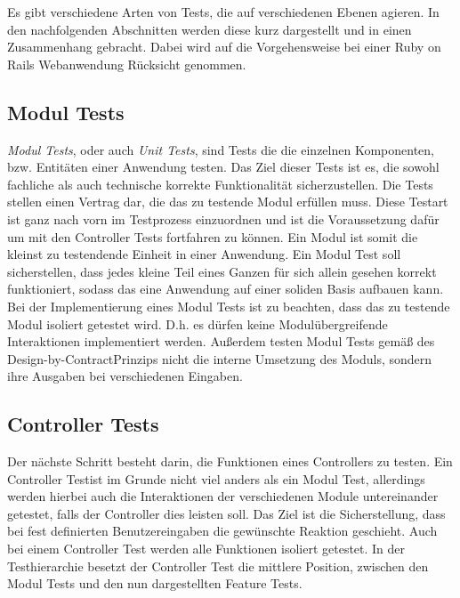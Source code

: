 \documentclass[12pt,             %
               a4paper,          %
               listof=totoc,     %
               index=totoc,      %
               bibliography=totoc,%
               oneside,         %
               BCOR1cm,          %
               english   %
               ]{scrbook}
\begin{document}
Es gibt verschiedene Arten von Tests, die auf verschiedenen Ebenen agieren. In den nachfolgenden Abschnitten werden diese kurz dargestellt und in einen Zusammenhang gebracht. Dabei wird auf die Vorgehensweise bei einer Ruby on Rails Webanwendung Rücksicht genommen. 

\subsection{Modul Tests}
\textit{Modul Tests}, oder auch \textit{Unit Tests}, sind Tests die die einzelnen Komponenten, bzw. Entitäten einer Anwendung testen. Das Ziel dieser Tests ist es, die sowohl fachliche als auch technische korrekte Funktionalität sicherzustellen. Die Tests stellen einen Vertrag dar, die das zu testende Modul erfüllen muss. Diese Testart ist ganz nach vorn im Testprozess einzuordnen und ist die Voraussetzung dafür um mit den Controller Tests fortfahren zu können. Ein Modul ist somit die kleinst zu testendende Einheit in einer Anwendung. Ein Modul Test soll sicherstellen, dass jedes kleine Teil eines Ganzen für sich allein gesehen korrekt funktioniert, sodass das eine Anwendung auf einer soliden Basis aufbauen kann. Bei der Implementierung eines Modul Tests ist zu beachten, dass das zu testende Modul isoliert getestet wird. D.h. es dürfen keine Modulübergreifende Interaktionen implementiert werden. Außerdem testen Modul Tests gemäß des \glqq Design-by-Contract\grqq Prinzips nicht die interne Umsetzung des Moduls, sondern ihre Ausgaben bei verschiedenen Eingaben.

\subsection{Controller Tests}
Der nächste Schritt besteht darin, die Funktionen eines Controllers zu testen. Ein \glqq Controller Test\grqq ist im Grunde nicht viel anders als ein Modul Test, allerdings werden hierbei auch die Interaktionen der verschiedenen Module untereinander getestet, falls der Controller dies leisten soll. Das Ziel ist die Sicherstellung, dass bei fest definierten Benutzereingaben die gewünschte Reaktion geschieht. Auch bei einem Controller Test werden alle Funktionen isoliert getestet. In der Testhierarchie besetzt der Controller Test die mittlere Position, zwischen den Modul Tests und den nun dargestellten Feature Tests.
\end{document}
